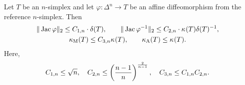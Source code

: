 \documentclass[10pt,a4paper]{article}
\begin{document}
\begin{lemma}\label{lemma:measurerelationships}
    Let $T$ be an $n$-simplex and let $\varphi : \Delta^{n} \rightarrow T$ be an affine diffeomorphism from the reference $n$-simplex. Then 
    \begin{gather*}
        \matnorm{\Jacobian \varphi}
        \leq 
        \Ceins{n} \cdot \diam(T) %
        ,
        \qquad 
        \matnorm{ \Jacobian \varphi^{-1} }
        \leq 
        \Czwei{n} \cdot 
        \geometricshapemeasure(T) 
        \diam(T)^{-1}
        ,
        \\
        \algebraicshapemeasure(T)
        \leq 
        \Cdrei{n}
        \geometricshapemeasure(T)
        ,
        \qquad 
        \aspectratio(T)
        \leq 
        \geometricshapemeasure(T)
        .
    \end{gather*}
    Here,
    \begin{align*}
        \Ceins{n} \leq \sqrt{n},
        \quad 
        \Czwei{n} \leq          \left( \frac{n-1}{n} \right)^{\frac{2}{n-1}}, 
        \quad 
        \Cdrei{n} \leq \Ceins{n}\Czwei{n} %
        . 
    \end{align*}
\end{lemma}
\end{document}

